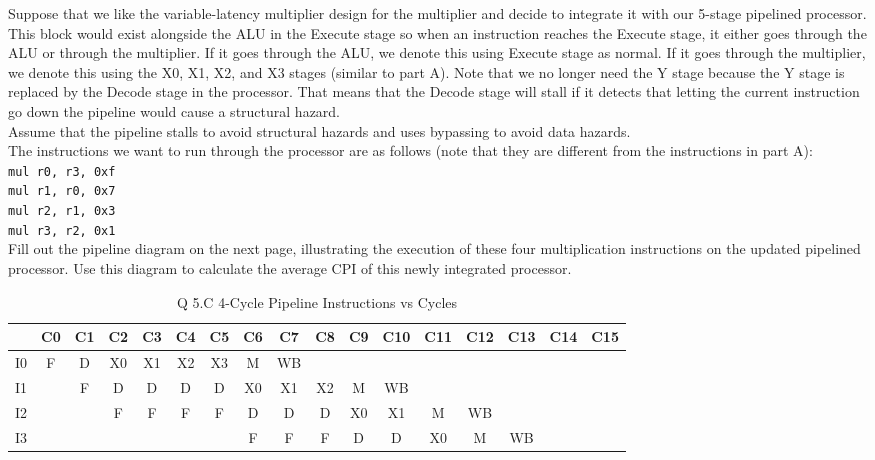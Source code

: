 \documentclass[a4paper,11pt]{article}
\begin{document}
Suppose that we like the variable-latency multiplier design for the multiplier and decide to integrate it with our 5-stage pipelined processor. This block would exist alongside the ALU in the Execute stage so when an instruction reaches the Execute stage, it either goes through the ALU or through the multiplier. If it goes through the ALU, we denote this using Execute stage as normal. If it goes through the multiplier, we denote this using the X0, X1, X2, and X3 stages (similar to part A). Note that we no longer need the Y stage because the Y stage is replaced by the Decode stage in the processor. That means that the Decode stage will stall if it detects that letting the current instruction go down the pipeline would cause a structural hazard. \\

Assume that the pipeline stalls to avoid structural hazards and uses bypassing to avoid data hazards. \\

The instructions we want to run through the processor are as follows (note that they are different from the instructions in part A): \\
\texttt{mul r0, r3, 0xf} \\
\texttt{mul r1, r0, 0x7} \\
\texttt{mul r2, r1, 0x3} \\
\texttt{mul r3, r2, 0x1} \\

Fill out the pipeline diagram on the next page, illustrating the execution of these four multiplication instructions on the updated pipelined processor. Use this diagram to calculate the average CPI of this newly integrated processor.



\begin{table}[H]
\caption{Q 5.C 4-Cycle Pipeline Instructions vs Cycles}
\begin{center}
\begin{tabular}{|c|c|c|c|c|c|c|c|c|c|c|c|c|c|c|c|c|} \hline
     & C0 & C1 & C2 & C3 & C4  & C5  & C6   & C7   & C8 & C9 & C10 & C11 & C12 & C13 & C14 & C15  \\ \hline
  I0 & F  &  D & X0 & X1 & X2  & X3  & M    & WB   &    &     &     &     &     &     &    &      \\ \hline   
  I1 &    &  F & D  & D  & D   & D   & X0   & X1   & X2 & M   & WB  &     &     &     &    &      \\ \hline   
  I2 &    &    & F  & F  & F   & F   & D    & D    & D  & X0  & X1  & M   &  WB &     &    &      \\ \hline   
  I3 &    &    &    &    &     &     & F    & F    & F  & D   & D   & X0  &  M  & WB  &    &      \\ \hline   
\end{tabular}
\end{center}
\end{table}
\end{document}
